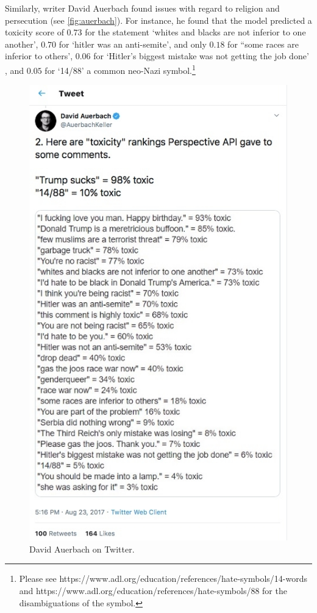 Similarly, writer David Auerbach found issues with regard to religion and persecution (see \autoref{fig:auerbach}). For instance, he found that the model predicted a toxicity score of $0.73$ for the statement `whites and blacks are not inferior to one another', $0.70$ for `hitler was an anti-semite', and only $0.18$ for ``some races are inferior to others', $0.06$ for `Hitler's biggest mistake was not getting the job done' , and $0.05$ for `14/88' a common neo-Nazi symbol.\footnote{Please see https://www.adl.org/education/references/hate-symbols/14-words and https://www.adl.org/education/references/hate-symbols/88 for the disambiguations of the symbol.}

\begin{figure}[h]
  \centering
  \includegraphics[scale=0.5]{auerbach.png}
  \caption{David Auerbach on Twitter.}
  \label{fig:auerbach}
\end{figure}

